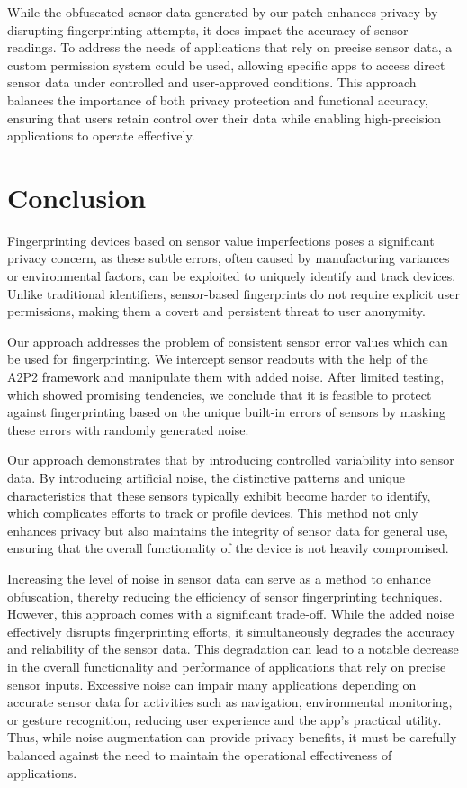 \documentclass[11pt,
  oneside,openany,    %
]{scrreprt}
\begin{document}
While the obfuscated sensor data generated by our patch enhances privacy by disrupting fingerprinting attempts, it does impact the accuracy of sensor readings. 
To address the needs of applications that rely on precise sensor data, a custom permission system could be used, allowing specific apps to access direct sensor data under controlled and user-approved conditions. 
This approach balances the importance of both privacy protection and functional accuracy, ensuring that users retain control over their data while enabling high-precision applications to operate effectively.


\chapter{Conclusion}
\label{chap:conclusion}
Fingerprinting devices based on sensor value imperfections poses a significant privacy concern, as these subtle errors, often caused by manufacturing variances or environmental factors, can be exploited to uniquely identify and track devices.
Unlike traditional identifiers, sensor-based fingerprints do not require explicit user permissions, making them a covert and persistent threat to user anonymity. 

Our approach addresses the problem of consistent sensor error values which can be used for fingerprinting.
We intercept sensor readouts with the help of the A2P2 framework and manipulate them with added noise.
After limited testing, which showed promising tendencies, we conclude that it is feasible to protect against fingerprinting based on the unique built-in errors of sensors by masking these errors with randomly generated noise.

Our approach demonstrates that by introducing controlled variability into sensor data.
By introducing artificial noise, the distinctive patterns and unique characteristics that these sensors typically exhibit become harder to identify, which complicates efforts to track or profile devices.
This method not only enhances privacy but also maintains the integrity of sensor data for general use, ensuring that the overall functionality of the device is not heavily compromised.

Increasing the level of noise in sensor data can serve as a method to enhance obfuscation, thereby reducing the efficiency of sensor fingerprinting techniques.
However, this approach comes with a significant trade-off.
While the added noise effectively disrupts fingerprinting efforts, it simultaneously degrades the accuracy and reliability of the sensor data.
This degradation can lead to a notable decrease in the overall functionality and performance of applications that rely on precise sensor inputs.
Excessive noise can impair many applications depending on accurate sensor data for activities such as navigation, environmental monitoring, or gesture recognition, reducing user experience and the app's practical utility.
Thus, while noise augmentation can provide privacy benefits, it must be carefully balanced against the need to maintain the operational effectiveness of applications.
\end{document}
